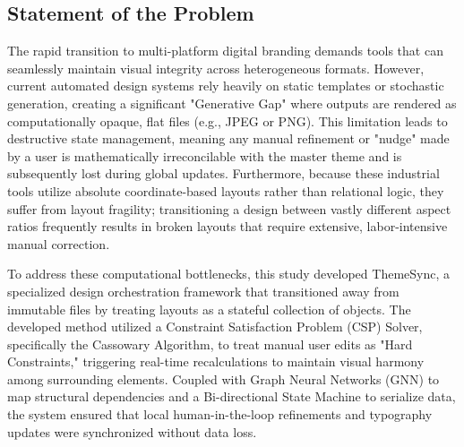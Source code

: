 \begin{refsection}

\section{Statement of the Problem}
The rapid transition to multi-platform digital branding demands tools that can seamlessly maintain visual integrity across heterogeneous formats. However, current automated design systems rely heavily on static templates or stochastic generation, creating a significant "Generative Gap" where outputs are rendered as computationally opaque, flat files (e.g., JPEG or PNG). This limitation leads to destructive state management, meaning any manual refinement or "nudge" made by a user is mathematically irreconcilable with the master theme and is subsequently lost during global updates. Furthermore, because these industrial tools utilize absolute coordinate-based layouts rather than relational logic, they suffer from layout fragility; transitioning a design between vastly different aspect ratios frequently results in broken layouts that require extensive, labor-intensive manual correction.

To address these computational bottlenecks, this study developed ThemeSync, a specialized design orchestration framework that transitioned away from immutable files by treating layouts as a stateful collection of objects. The developed method utilized a Constraint Satisfaction Problem (CSP) Solver, specifically the Cassowary Algorithm, to treat manual user edits as "Hard Constraints," triggering real-time recalculations to maintain visual harmony among surrounding elements. Coupled with Graph Neural Networks (GNN) to map structural dependencies and a Bi-directional State Machine to serialize data, the system ensured that local human-in-the-loop refinements and typography updates were synchronized without data loss. 



\end{refsection}

